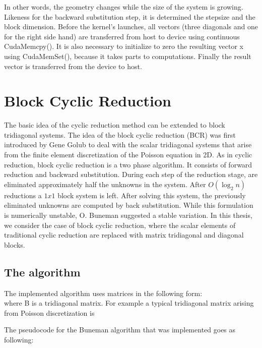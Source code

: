 In other words, the geometry changes while the size of the system is growing. 
Likeness for the backward substitution step, it is determined the stepsize and the block dimension.
Before the kernel’s launches, all vectors (three diagonals and one for the right side hand) are transferred from host to device using continuous CudaMemcpy(). It is also necessary to initialize to zero the resulting vector x using CudaMemSet(), because it takes parts to computations. Finally the result vector is transferred from the device to host.

\section{Block Cyclic Reduction}

The basic idea of the cyclic reduction method can be extended to block tridiagonal systems. The idea of the block cyclic reduction (BCR) was first introduced by Gene Golub to deal with the scalar tridiagonal systems that arise from the finite element discretization of the Poisson equation in 2D. As in cyclic reduction, block cyclic reduction is a two phase algorithm. It consists of forward reduction and backward substitution. During each step of the reduction stage, are eliminated approximately half the unknowns in the system. After $O(\log_2 n)$ reductions a $1x1$ block system is left. After solving this system, the previously eliminated unknowns are computed by back substitution. While this formulation is numerically unstable, O. Buneman suggested a stable variation.  In this thesis, we consider the case of block cyclic reduction, where the scalar elements of traditional cyclic reduction are replaced with matrix tridiagonal and diagonal blocks.

\subsection{The algorithm}

The implemented algorithm uses matrices in the following form:\\

where B is a tridiagonal matrix. For example a typical tridiagonal matrix arising from 
Poisson discretization is    

The pseudocode for the Buneman algorithm that was implemented goes as following: 


